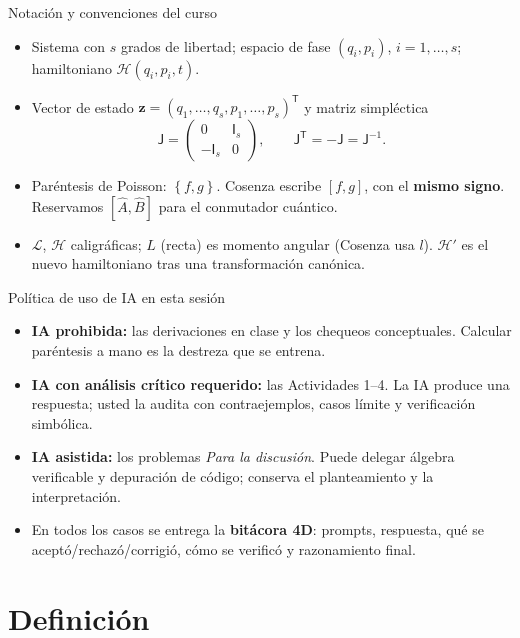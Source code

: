 \documentclass[spanish]{beamer}
\newcommand{\Lag}{\mathcal{L}}
\newcommand{\Ham}{\mathcal{H}}
\newcommand{\pb}[2]{\left\{#1,#2\right\}}   %
\newcommand{\J}{\mathsf{J}}                  %
\begin{document}
\begin{frame}{Notación y convenciones del curso}
\begin{itemize}
  \item Sistema con $s$ grados de libertad; espacio de fase $(q_i,p_i)$,
        $i=1,\ldots,s$; hamiltoniano $\Ham(q_i,p_i,t)$.
  \item Vector de estado $\mathbf z = (q_1,\ldots,q_s,p_1,\ldots,p_s)^{\mathsf T}$ y
        matriz simpléctica
  \[
    \J = \begin{pmatrix} 0 & \mathsf I_s \\ -\mathsf I_s & 0 \end{pmatrix},
    \qquad \J^{\mathsf T} = -\J = \J^{-1}.
  \]
  \item Paréntesis de Poisson: $\pb{f}{g}$. Cosenza escribe $[f,g]$, con el
        \textbf{mismo signo}. Reservamos $[\hat A,\hat B]$ para el conmutador cuántico.
  \item $\Lag$, $\Ham$ caligráficas; $L$ (recta) es momento angular
        (Cosenza usa $l$). $\Ham'$ es el nuevo hamiltoniano tras una transformación
        canónica.
\end{itemize}
\end{frame}

\begin{frame}{Política de uso de IA en esta sesión}
\begin{itemize}
  \item<1-> \textbf{IA prohibida:} las derivaciones en clase y los chequeos
        conceptuales. Calcular paréntesis a mano es la destreza que se entrena.
  \item<2-> \textbf{IA con análisis crítico requerido:} las Actividades 1--4.
        La IA produce una respuesta; usted la audita con contraejemplos, casos
        límite y verificación simbólica.
  \item<3-> \textbf{IA asistida:} los problemas \emph{Para la discusión}. Puede delegar
        álgebra verificable y depuración de código; conserva el planteamiento y la
        interpretación.
  \item<4-> En todos los casos se entrega la \textbf{bitácora 4D}: prompts, respuesta,
        qué se aceptó/rechazó/corrigió, cómo se verificó y razonamiento final.
\end{itemize}
\end{frame}

\section{Definición}
\end{document}
